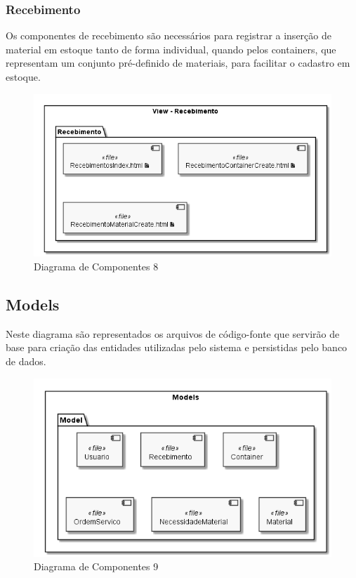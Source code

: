 \documentclass[rascunho,xindy,acronym,symbols]{fei}
\begin{document}
\subsubsection{Recebimento}

Os componentes de recebimento são necessários para registrar a inserção de material em estoque tanto de forma individual, quando pelos containers, que representam um conjunto pré-definido de materiais, para facilitar o cadastro em estoque.

\begin{figure}[H]
    \centering
    \includegraphics[scale=0.6, width=400pt]{./Images/Diagrama_de_Componentes_-_Recebimento.png}
    \caption{Diagrama de Componentes 8}
    \label{fig:diag_componentes8}
\end{figure}

\subsection{Models}

Neste diagrama são representados os arquivos de código-fonte que servirão de base para criação das entidades utilizadas pelo sistema e persistidas pelo banco de dados.

\begin{figure}[H]
    \centering
    \includegraphics[scale=0.6, width=400pt]{./Images/Diagrama_de_Componentes_-_Models.png}
    \caption{Diagrama de Componentes 9}
    \label{fig:diag_componentes3}
\end{figure}
\end{document}
